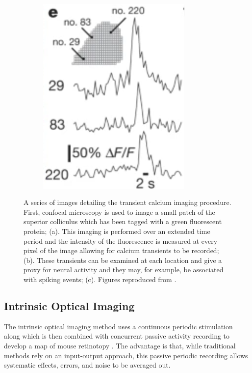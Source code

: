 \begin{figure}[h!]
~
	\begin{subfigure}{0.2\linewidth}
		\includegraphics[width = \textwidth]{images/introduction/calcium3}
		\caption{} 
	\end{subfigure}
	\def\c{A series of images detailing the transient calcium imaging procedure. }
	\caption[\c]{\c First, confocal microscopy is used to image a small patch of the superior colliculus which has been tagged with a green fluorescent protein; (a). This imaging is performed over an extended time period and the intensity of the fluorescence is measured at every pixel of the image allowing for calcium transients to be recorded; (b). These transients can be examined at each location and give a proxy for neural activity and they may, for example, be associated with spiking events; (c). Figures reproduced from \cite{Ackman2012-uu}. \label{fig:calcium}}
\end{figure}


\subsection{Intrinsic Optical Imaging \label{sec:optical}}
The intrinsic optical imaging method uses a continuous periodic stimulation along which is then combined with concurrent passive activity recording to develop a map of mouse retinotopy \cite{Kalatsky2003-cz}. The advantage is that, while traditional methods rely on an input-output approach, this passive periodic recording allows systematic effects, errors, and noise to be averaged out.

